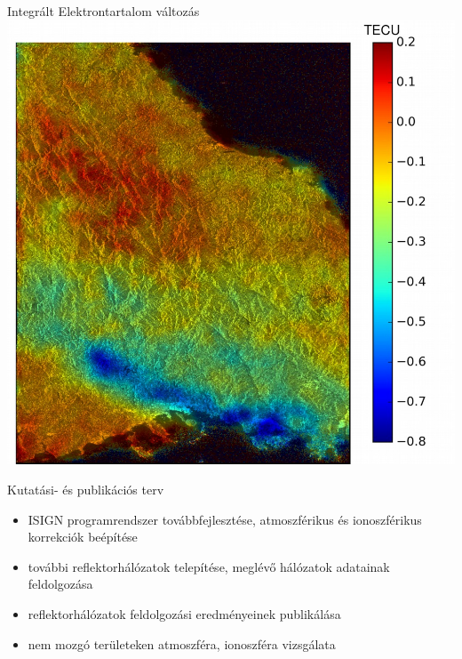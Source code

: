 \documentclass{beamer}
\begin{document}
\begin{frame}{Integrált Elektrontartalom változás}
\includegraphics[width=\textwidth]{iono.png}
\end{frame}


\begin{frame}{Kutatási- és publikációs terv}

\begin{itemize}
    \item ISIGN programrendszer továbbfejlesztése, atmoszférikus
    és ionoszférikus korrekciók beépítése
    \item további reflektorhálózatok telepítése, meglévő hálózatok adatainak
    feldolgozása
    \item reflektorhálózatok feldolgozási eredményeinek publikálása
    \item nem mozgó területeken atmoszféra, ionoszféra vizsgálata
\end{itemize}

\end{frame}
\end{document}
